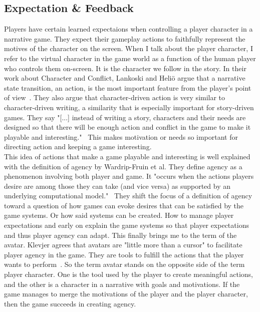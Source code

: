 \subsection{Expectation \& Feedback}
\label{section:expfee}
Players have certain learned expectaions when controlling a player character in a narrative game. They expect their gameplay actions to faithfully represent the motives of the character on the screen. When I talk about the player character, I refer to the virtual character in the game world as a function of the human player who controls them on-screen. It is the character we follow in the story. In their work about Character and Conflict, Lankoski and Heliö argue that a narrative state transition, an action, is the most important feature from the player’s point of view~\cite{Lankoski2002}. They also argue that character-driven action is very similar to character-driven writing, a similarity that is especially important for story-driven games. They say "[...] instead of writing a story, characters and their needs are designed so that there will be enough action and conflict in the game to make it playable and interesting."~\cite{Lankoski2002} This makes motivation or needs so important for directing action and keeping a game interesting.\\
This idea of actions that make a game playable and interesting is well explained with the definition of agency by Wardrip-Fruin et al. They define agency as a phenomenon involving both player and game. It "occurs when the actions players desire are among those they can take (and vice versa) as supported by an underlying computational model."~\cite{Rohtua2009} They shift the focus of a definition of agency toward a question of how games can evoke desires that can be satisfied by the game systems. Or how said systems can be created. How to manage player expectations and early on explain the game systems so that player expectations and thus player agency can adapt. This finally brings me to the term of the avatar. Klevjer agrees that avatars are "little more than a cursor" to facilitate player agency in the game. They are tools to fulfill the actions that the player wants to perform~\cite{Klevjer2012}. So the term avatar stands on the opposite side of the term player character. One is the tool used by the player to create meaningful actions, and the other is a character in a narrative with goals and motivations. If the game manages to merge the motivations of
the player and the player character, then the game succeeds in creating agency.\\
